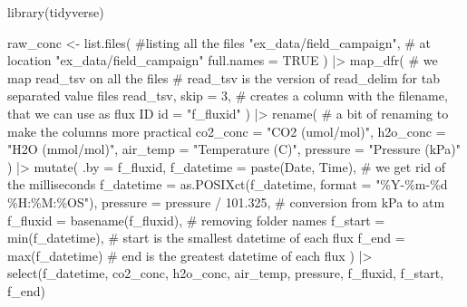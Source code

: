 \documentclass[
  letterpaper,
  DIV=11,
  numbers=noendperiod]{scrartcl}
\newenvironment{Shaded}{\begin{snugshade}}{\end{snugshade}}
\newcommand{\AttributeTok}[1]{\textcolor[rgb]{0.40,0.45,0.13}{#1}}
\newcommand{\CommentTok}[1]{\textcolor[rgb]{0.37,0.37,0.37}{#1}}
\newcommand{\ConstantTok}[1]{\textcolor[rgb]{0.56,0.35,0.01}{#1}}
\newcommand{\DecValTok}[1]{\textcolor[rgb]{0.68,0.00,0.00}{#1}}
\newcommand{\FloatTok}[1]{\textcolor[rgb]{0.68,0.00,0.00}{#1}}
\newcommand{\FunctionTok}[1]{\textcolor[rgb]{0.28,0.35,0.67}{#1}}
\newcommand{\NormalTok}[1]{\textcolor[rgb]{0.00,0.23,0.31}{#1}}
\newcommand{\OtherTok}[1]{\textcolor[rgb]{0.00,0.23,0.31}{#1}}
\newcommand{\SpecialCharTok}[1]{\textcolor[rgb]{0.37,0.37,0.37}{#1}}
\newcommand{\StringTok}[1]{\textcolor[rgb]{0.13,0.47,0.30}{#1}}
\begin{document}
\begin{Shaded}
\begin{Highlighting}[]
\FunctionTok{library}\NormalTok{(tidyverse)}

\NormalTok{raw\_conc }\OtherTok{\textless{}{-}} \FunctionTok{list.files}\NormalTok{( }\CommentTok{\#listing all the files}
  \StringTok{"ex\_data/field\_campaign"}\NormalTok{, }\CommentTok{\# at location "ex\_data/field\_campaign"}
  \AttributeTok{full.names =} \ConstantTok{TRUE}
\NormalTok{) }\SpecialCharTok{|\textgreater{}}
  \FunctionTok{map\_dfr}\NormalTok{( }\CommentTok{\# we map read\_tsv on all the files}
    \CommentTok{\# read\_tsv is the version of read\_delim for tab separated value files}
\NormalTok{    read\_tsv,}
    \AttributeTok{skip =} \DecValTok{3}\NormalTok{,}
    \CommentTok{\# creates a column with the filename, that we can use as flux ID}
    \AttributeTok{id =} \StringTok{"f\_fluxid"}
\NormalTok{  ) }\SpecialCharTok{|\textgreater{}}
  \FunctionTok{rename}\NormalTok{( }\CommentTok{\# a bit of renaming to make the columns more practical}
    \AttributeTok{co2\_conc =} \StringTok{"CO2 (umol/mol)"}\NormalTok{,}
    \AttributeTok{h2o\_conc =} \StringTok{"H2O (mmol/mol)"}\NormalTok{,}
    \AttributeTok{air\_temp =} \StringTok{"Temperature (C)"}\NormalTok{,}
    \AttributeTok{pressure =} \StringTok{"Pressure (kPa)"}
\NormalTok{  ) }\SpecialCharTok{|\textgreater{}}
  \FunctionTok{mutate}\NormalTok{(}
    \AttributeTok{.by =}\NormalTok{ f\_fluxid,}
    \AttributeTok{f\_datetime =} \FunctionTok{paste}\NormalTok{(Date, Time),}
    \CommentTok{\# we get rid of the milliseconds}
    \AttributeTok{f\_datetime =} \FunctionTok{as.POSIXct}\NormalTok{(f\_datetime, }\AttributeTok{format =} \StringTok{"\%Y{-}\%m{-}\%d \%H:\%M:\%OS"}\NormalTok{),}
    \AttributeTok{pressure =}\NormalTok{ pressure }\SpecialCharTok{/} \FloatTok{101.325}\NormalTok{, }\CommentTok{\# conversion from kPa to atm}
    \AttributeTok{f\_fluxid =} \FunctionTok{basename}\NormalTok{(f\_fluxid), }\CommentTok{\# removing folder names}
    \AttributeTok{f\_start =} \FunctionTok{min}\NormalTok{(f\_datetime), }\CommentTok{\# start is the smallest datetime of each flux}
    \AttributeTok{f\_end =} \FunctionTok{max}\NormalTok{(f\_datetime) }\CommentTok{\# end is the greatest datetime of each flux}
\NormalTok{  ) }\SpecialCharTok{|\textgreater{}}
  \FunctionTok{select}\NormalTok{(f\_datetime, co2\_conc, h2o\_conc, air\_temp,}
\NormalTok{         pressure, f\_fluxid, f\_start, f\_end)}
\end{Highlighting}
\end{Shaded}
\end{document}
